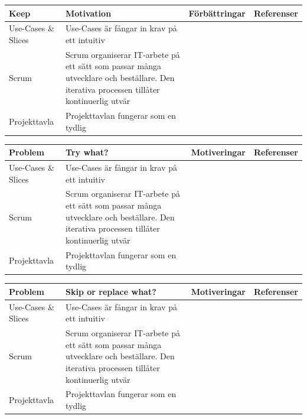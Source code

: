 \documentclass[conference,a4paper]{IEEEtran}
\newcommand\Tstrut{\rule{0pt}{2.6ex}}       %
\newcommand\Bstrut{\rule[-0.9ex]{0pt}{0pt}} %
\newcommand{\TBstrut}{\Tstrut\Bstrut} %
\begin{document}
\begin{table}[H]
	\small
  \centering
	\begin{tabular}{|p{1.5cm}|p{2cm}|p{1.8cm}|p{1.5cm}|} %
    \hline
    Keep & Motivation & Förbättringar & Referenser \TBstrut \\
    \hline
    Use-Cases \& Slices & Use-Cases är fångar in krav på ett intuitiv & & \TBstrut \\
    \hline
    Scrum & Scrum organiserar IT-arbete på ett sätt som passar många utvecklare och beställare. Den iterativa processen tillåter kontinuerlig utvär & & \TBstrut \\
    \hline
    Projekttavla & Projekttavlan fungerar som en tydlig & & \TBstrut \\
    \hline
  \end{tabular}
\end{table}

\begin{table}[H]
	\small
  \centering
	\begin{tabular}{|p{1.5cm}|p{2cm}|p{1.8cm}|p{1.5cm}|} %
    \hline
    Problem & Try what? & Motiveringar & Referenser \TBstrut \\
    \hline
    Use-Cases \& Slices & Use-Cases är fångar in krav på ett intuitiv & & \TBstrut \\
    \hline
    Scrum & Scrum organiserar IT-arbete på ett sätt som passar många utvecklare och beställare. Den iterativa processen tillåter kontinuerlig utvär & & \TBstrut \\
    \hline
    Projekttavla & Projekttavlan fungerar som en tydlig & & \TBstrut \\
    \hline
  \end{tabular}
\end{table}

\begin{table}[H]
	\small
  \centering
	\begin{tabular}{|p{1.5cm}|p{2cm}|p{1.8cm}|p{1.5cm}|} %
    \hline
    Problem & Skip or replace what? & Motiveringar & Referenser \TBstrut \\
    \hline
    Use-Cases \& Slices & Use-Cases är fångar in krav på ett intuitiv & & \TBstrut \\
    \hline
    Scrum & Scrum organiserar IT-arbete på ett sätt som passar många utvecklare och beställare. Den iterativa processen tillåter kontinuerlig utvär & & \TBstrut \\
    \hline
    Projekttavla & Projekttavlan fungerar som en tydlig & & \TBstrut \\
    \hline
  \end{tabular}
\end{table}
\end{document}
